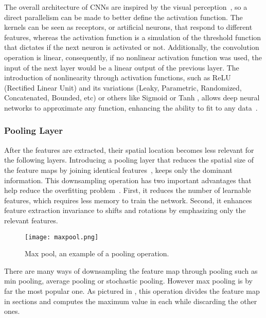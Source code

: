 \documentclass[class=report, crop=false, a4paper, 12pt]{standalone}
\begin{document}
\par The overall architecture of CNNs are inspired by the visual perception~\autocite{hubelReceptiveFieldsBinocular1962}, so a direct parallelism can be made to better define the activation function. The kernels can be seen as receptors, or artificial neurons, that respond to different features, whereas the activation function is a simulation of the threshold function that dictates if the next neuron is activated or not. Additionally, the convolution operation is linear, consequently, if no nonlinear activation function was used, the input of the next layer would be a linear output of the previous layer. The introduction of nonlinearity through activation functions, such as ReLU (Rectified Linear Unit) and its variations (Leaky, Parametric, Randomized, Concatenated, Bounded, etc) or others like Sigmoid or Tanh \autocite{dubeyActivationFunctionsDeep2022}, allows deep neural networks to approximate any function, enhancing the ability to fit to any data~\autocite{liSurveyConvolutionalNeural2022}.

\subsubsection{Pooling Layer}
After the features are extracted, their spatial location becomes less relevant for the following layers. Introducing a pooling layer that reduces the spatial size of the feature maps by joining identical features~\autocite{lecunDeepLearning2015, guRecentAdvancesConvolutional2018}, keeps only the dominant information. This downsampling operation has two important advantages that help reduce the overfitting problem~\autocite{ajitReviewConvolutionalNeural2020,liSurveyConvolutionalNeural2022}. First, it reduces the number of learnable features, which requires less memory to train the network. Second, it enhances feature extraction invariance to shifts and rotations by emphasizing only the relevant features.

\begin{figure}[!h]
    \centering
    \texttt{[image: maxpool.png]} %
    \caption{Max pool, an example of a pooling operation.}
    \label{fig:maxpool}
\end{figure}

There are many ways of downsampling the feature map through pooling such as min pooling, average pooling or stochastic pooling. However max pooling is by far the most popular one. As pictured in , this operation divides the feature map in sections and computes the maximum value in each while discarding the other ones.
\end{document}
